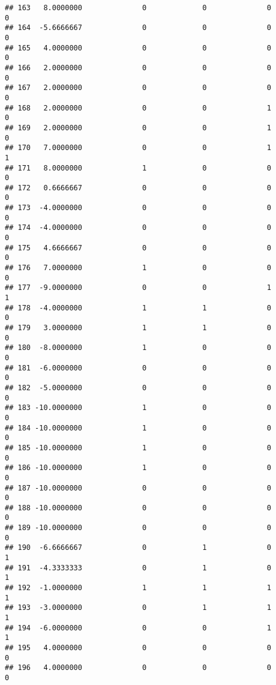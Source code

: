 \documentclass[
]{article}
\begin{document}
\begin{verbatim}
## 163   8.0000000              0             0              0             0
## 164  -5.6666667              0             0              0             0
## 165   4.0000000              0             0              0             0
## 166   2.0000000              0             0              0             0
## 167   2.0000000              0             0              0             0
## 168   2.0000000              0             0              1             0
## 169   2.0000000              0             0              1             0
## 170   7.0000000              0             0              1             1
## 171   8.0000000              1             0              0             0
## 172   0.6666667              0             0              0             0
## 173  -4.0000000              0             0              0             0
## 174  -4.0000000              0             0              0             0
## 175   4.6666667              0             0              0             0
## 176   7.0000000              1             0              0             0
## 177  -9.0000000              0             0              1             1
## 178  -4.0000000              1             1              0             0
## 179   3.0000000              1             1              0             0
## 180  -8.0000000              1             0              0             0
## 181  -6.0000000              0             0              0             0
## 182  -5.0000000              0             0              0             0
## 183 -10.0000000              1             0              0             0
## 184 -10.0000000              1             0              0             0
## 185 -10.0000000              1             0              0             0
## 186 -10.0000000              1             0              0             0
## 187 -10.0000000              0             0              0             0
## 188 -10.0000000              0             0              0             0
## 189 -10.0000000              0             0              0             0
## 190  -6.6666667              0             1              0             1
## 191  -4.3333333              0             1              0             1
## 192  -1.0000000              1             1              1             1
## 193  -3.0000000              0             1              1             1
## 194  -6.0000000              0             0              1             1
## 195   4.0000000              0             0              0             0
## 196   4.0000000              0             0              0             0

\end{verbatim}
\end{document}
